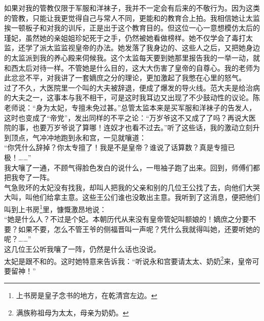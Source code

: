 如果对我的管教仅限于军服和洋袜子，我并不一定会有后来的不敬行为。因为这类的管教，只能让我更觉得自己与常人不同，更能和的教育合上拍。我相信她让太监挨一顿板子和对我的训斥，正是出于这个教育目的。但这位一心一意想模仿太后的瑾妃，虽然她的亲姐姐珍妃死于之手，仍然被她看做榜样。她不仅学会了毒打太监，还学了派太监监视皇帝的办法。她发落了我身边的、这些人之后，又把她身边的太监派到我的养心殿来伺候我。这个太监每天要到她那里报告我的一举一动，就和西太后对待一样。不管她是什么目的，这大大伤害了皇帝的自尊心。我的老师为此忿忿不平，对我讲了一套嫡庶之分的理论，更加激起了我憋在心里的怒气。\\

过了不久，大医院里一个叫的大夫被辞退，便成了爆发的导火线。范大夫是给治病的大夫之一，这事本与我不相干，可是这时我耳边又出现了不少鼓动性的议论。陈老师说：“身为太妃，专擅未免过甚。”总管太监本来是买军服和洋袜子的告发人，这时也变成了“帝党”，发出同样的不平之论：“万岁爷这不又成了了吗？再说大医院的事，也要万岁爷说了算哪！连奴才也看不过去。”听了这些话，我的激动立刻升到顶点，气冲冲地跑到永和宫，一见就嚷道：\\

“你凭什么辞掉？你太专擅了！我是不是皇帝？谁说了话算数？真是专擅已极！……”\\

我大嚷了一通，不顾气得脸色发白的说什么，一甩袖子跑了出来。回到，师傅们都把我夸了一阵。\\

气急败坏的太妃没有找我，却叫人把我的父亲和别的几位王公找了去，向他们大哭大叫，叫他们给拿主意。这些王公们谁也没敢出主意。我听到了这消息，便把他们叫到上书房\footnote{上书房是皇子念书的地方，在乾清宫左边。}里，慷慨激昂地说：\\

“她是什么人？不过是个妃。本朝历代从来没有皇帝管妃叫额娘的！嫡庶之分要不要？如果不要，怎么不管王爷的侧福晋叫一声呢？凭什么我就得叫她，还要听她的呢？……”\\

这几位王公听我嚷了一阵，仍然是什么话也没说。\\

太妃是跟不和的。这时她特意来告诉我：“听说永和宫要请太太、奶奶\footnote{满族称祖母为太太，母亲为奶奶。}来，皇帝可要留神！”\\


